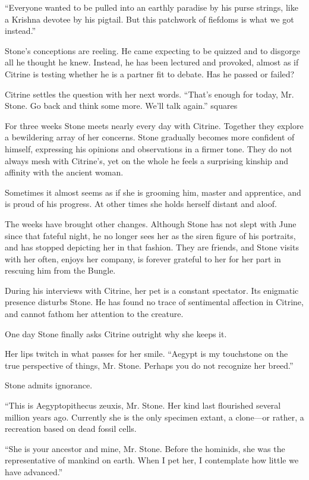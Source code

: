 “Everyone wanted to be pulled into an earthly paradise by his purse strings, like a Krishna devotee by his pigtail. But this patchwork of fiefdoms is what we got instead.”

Stone’s conceptions are reeling. He came expecting to be quizzed and to disgorge all he thought he knew. Instead, he has been lectured and provoked, almost as if Citrine is testing whether he is a partner fit to debate. Has he passed or failed?

Citrine settles the question with her next words. “That’s enough for today, Mr. Stone. Go back and think some more. We’ll talk again.”
squares

For three weeks Stone meets nearly every day with Citrine. Together they explore a bewildering array of her concerns. Stone gradually becomes more confident of himself, expressing his opinions and observations in a firmer tone. They do not always mesh with Citrine’s, yet on the whole he feels a surprising kinship and affinity with the ancient woman.

Sometimes it almost seems as if she is grooming him, master and apprentice, and is proud of his progress. At other times she holds herself distant and aloof.

The weeks have brought other changes. Although Stone has not slept with June since that fateful night, he no longer sees her as the siren figure of his portraits, and has stopped depicting her in that fashion. They are friends, and Stone visits with her often, enjoys her company, is forever grateful to her for her part in rescuing him from the Bungle.

During his interviews with Citrine, her pet is a constant spectator. Its enigmatic presence disturbs Stone. He has found no trace of sentimental affection in Citrine, and cannot fathom her attention to the creature.

One day Stone finally asks Citrine outright why she keeps it.

Her lips twitch in what passes for her smile. “Aegypt is my touchstone on the true perspective of things, Mr. Stone. Perhaps you do not recognize her breed.”

Stone admits ignorance.

“This is Aegyptopithecus zeuxis, Mr. Stone. Her kind last flourished several million years ago. Currently she is the only specimen extant, a clone—or rather, a recreation based on dead fossil cells.

“She is your ancestor and mine, Mr. Stone. Before the hominids, she was the representative of mankind on earth. When I pet her, I contemplate how little we have advanced.”

